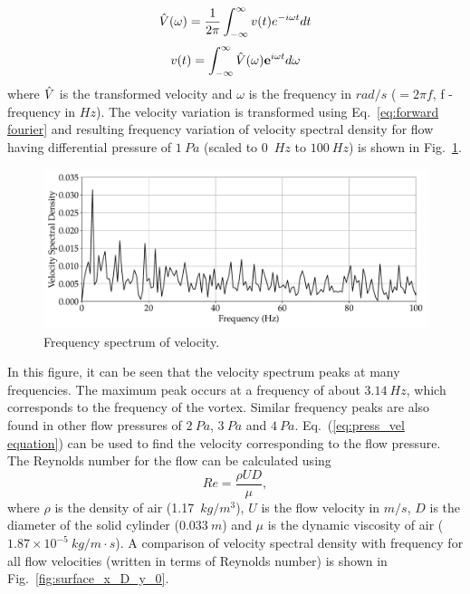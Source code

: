 \begin{equation}\label{eq:forward fourier}
        \Hat{V}(\omega) = \frac{1}{2\pi}\int^{\infty}_{-\infty}v(t)e^{-i\omega t}dt
\end{equation}
\begin{equation}\label{eq:backward fourier}
        v(t) = \int^{\infty}_{-\infty}\Hat{V}(\omega)\mathbf{e}^{i\omega t}d\omega
\end{equation}
where $\Hat{V}$ is the transformed velocity and $\omega$ is the frequency in $rad/s$ ($=2\pi f$, f - frequency in $Hz$). The velocity variation is transformed using Eq.~\ref{eq:forward fourier} and resulting frequency variation of velocity spectral density for flow having differential pressure of $1~Pa$ (scaled to 0~$Hz$ to $100~Hz$) is shown in Fig.~\ref{fig:vel_freq_1Pa}.
\begin{figure}
    \centering
    \includegraphics[width=\linewidth]{gfx/FFT_vel_1Pa.pdf}
    \caption{Frequency spectrum of velocity.}
    \label{fig:vel_freq_1Pa}
\end{figure}
In this figure, it can be seen that the velocity spectrum peaks at many frequencies. The maximum peak occurs at a frequency of about $3.14~Hz$, which corresponds to the frequency of the vortex. Similar frequency peaks are also found in other flow pressures of $2~Pa$, $3~Pa$ and $4~Pa$. Eq.~(\ref{eq:press_vel equation}) can be used to find the velocity corresponding to the flow pressure. The Reynolds number for the flow can be calculated using
\begin{equation}\label{eq:reynolds number}
    Re = \frac{\rho U D}{\mu},
\end{equation}
where $\rho$ is the density of air (1.17~$kg/m^3$), $U$ is the flow velocity in $m/s$, $D$ is the diameter of the solid cylinder ($0.033~m$) and $\mu$ is the dynamic viscosity of air ($1.87 \times 10^{-5}~kg/m\cdot s$). A comparison of velocity spectral density with frequency for all flow velocities (written in terms of Reynolds number) is shown in Fig.~\ref{fig:surface_x_D_y_0}.
